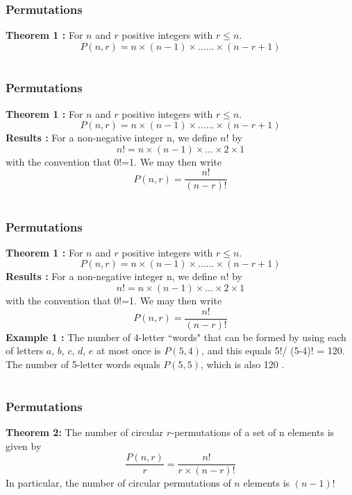 \documentclass{beamer}
\begin{document}
\section{}
 \begin{frame}
\frametitle{Permutations}
{\bf Theorem 1 : }For  $n$ and $r$ positive integers with $ r \le n$.\\
     $$P( n , r) = n \times (n-1) \times ......\times (n - r + 1)$$ 
\end{frame}

\section{}
 \begin{frame}
\frametitle{Permutations}
{\bf Theorem 1 : }For  $n$ and $r$ positive integers with $ r \le n$.\\
     $$P( n , r) = n \times (n-1) \times ......\times (n - r + 1)$$  
{\bf Results :} For a non-negative integer n, we define $n$! by 
                 $$n!=n\times(n-1)\times\dots\times2\times1$$
   with the convention that 0!=1. We may then write 
                $$P(n,r)=\frac{n!}{(n-r)!}$$
                \end{frame}

\section{}
 \begin{frame}
\frametitle{Permutations}
{\bf Theorem 1 : }For  $n$ and $r$ positive integers with $ r \le n$.\\
     $$P( n , r) = n \times (n-1) \times ......\times (n - r + 1)$$  
{\bf Results :} For a non-negative integer n, we define $n$! by 
                 $$n!=n\times(n-1)\times\dots\times2\times1$$
   with the convention that 0!=1. We may then write 
                $$P(n,r)=\frac{n!}{(n-r)!}$$
 {\bf Example 1 :  } The number of 4-letter ``words" that can be formed by using each of letters $a$, $b$, $c$, $d$, $e$ at most once is  $P(5,4)$, and this equals  5!/ (5-4)!  = 120. The number of 5-letter words equals $P(5,5)$, which is also 120 .
\end{frame}

\section{}
 \begin{frame}
\frametitle{Permutations}
{\bf Theorem 2: } The number of circular $r$-permutations of a set of n elements is given by
                               $$\frac{P(n,r)}{r}   =  \frac{n!}{r\times(n-r)!}$$
In particular, the number of circular permutations of $n$ elements is $(n-1)!$
\end{frame}
\end{document}
